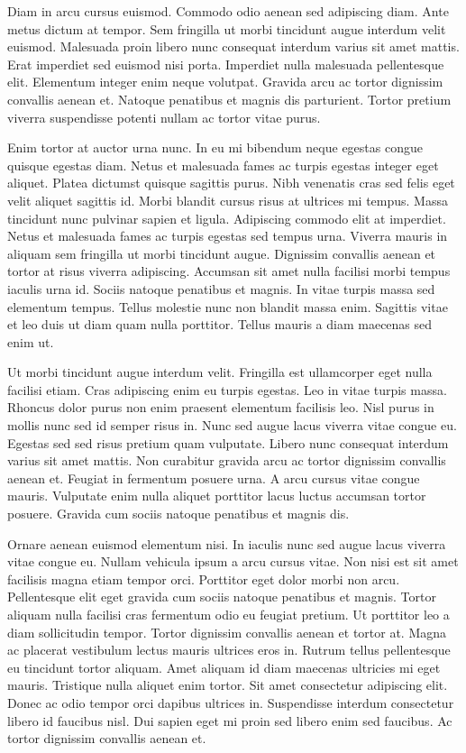 \documentclass[11pt,a4paper]{article}
\begin{document}
Diam in arcu cursus euismod. Commodo odio aenean sed adipiscing diam. Ante metus dictum at tempor. Sem fringilla ut morbi tincidunt augue interdum velit euismod. Malesuada proin libero nunc consequat interdum varius sit amet mattis. Erat imperdiet sed euismod nisi porta. Imperdiet nulla malesuada pellentesque elit. Elementum integer enim neque volutpat. Gravida arcu ac tortor dignissim convallis aenean et. Natoque penatibus et magnis dis parturient. Tortor pretium viverra suspendisse potenti nullam ac tortor vitae purus.

Enim tortor at auctor urna nunc. In eu mi bibendum neque egestas congue quisque egestas diam. Netus et malesuada fames ac turpis egestas integer eget aliquet. Platea dictumst quisque sagittis purus. Nibh venenatis cras sed felis eget velit aliquet sagittis id. Morbi blandit cursus risus at ultrices mi tempus. Massa tincidunt nunc pulvinar sapien et ligula. Adipiscing commodo elit at imperdiet. Netus et malesuada fames ac turpis egestas sed tempus urna. Viverra mauris in aliquam sem fringilla ut morbi tincidunt augue. Dignissim convallis aenean et tortor at risus viverra adipiscing. Accumsan sit amet nulla facilisi morbi tempus iaculis urna id. Sociis natoque penatibus et magnis. In vitae turpis massa sed elementum tempus. Tellus molestie nunc non blandit massa enim. Sagittis vitae et leo duis ut diam quam nulla porttitor. Tellus mauris a diam maecenas sed enim ut.

Ut morbi tincidunt augue interdum velit. Fringilla est ullamcorper eget nulla facilisi etiam. Cras adipiscing enim eu turpis egestas. Leo in vitae turpis massa. Rhoncus dolor purus non enim praesent elementum facilisis leo. Nisl purus in mollis nunc sed id semper risus in. Nunc sed augue lacus viverra vitae congue eu. Egestas sed sed risus pretium quam vulputate. Libero nunc consequat interdum varius sit amet mattis. Non curabitur gravida arcu ac tortor dignissim convallis aenean et. Feugiat in fermentum posuere urna. A arcu cursus vitae congue mauris. Vulputate enim nulla aliquet porttitor lacus luctus accumsan tortor posuere. Gravida cum sociis natoque penatibus et magnis dis.

Ornare aenean euismod elementum nisi. In iaculis nunc sed augue lacus viverra vitae congue eu. Nullam vehicula ipsum a arcu cursus vitae. Non nisi est sit amet facilisis magna etiam tempor orci. Porttitor eget dolor morbi non arcu. Pellentesque elit eget gravida cum sociis natoque penatibus et magnis. Tortor aliquam nulla facilisi cras fermentum odio eu feugiat pretium. Ut porttitor leo a diam sollicitudin tempor. Tortor dignissim convallis aenean et tortor at. Magna ac placerat vestibulum lectus mauris ultrices eros in. Rutrum tellus pellentesque eu tincidunt tortor aliquam. Amet aliquam id diam maecenas ultricies mi eget mauris. Tristique nulla aliquet enim tortor. Sit amet consectetur adipiscing elit. Donec ac odio tempor orci dapibus ultrices in. Suspendisse interdum consectetur libero id faucibus nisl. Dui sapien eget mi proin sed libero enim sed faucibus. Ac tortor dignissim convallis aenean et.
\end{document}
